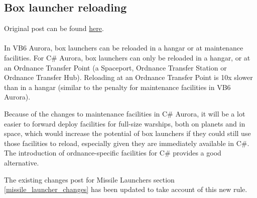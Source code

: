 \documentclass[../../Aurora C# unofficial manual.tex]{subfiles}
\begin{document}
	\subsection{Box launcher reloading}
	Original post can be found
	\href{http://aurora2.pentarch.org/index.php?topic=8495.msg109127#msg109127}{here}.
	\\\\
	
	In VB6 Aurora, box launchers can be reloaded in a hangar or at maintenance facilities. For C\# Aurora, box launchers can only be reloaded in a hangar, or at an Ordnance Transfer Point (a Spaceport, Ordnance Transfer Station or Ordnance Transfer Hub). Reloading at an Ordnance Transfer Point is 10x slower than in a hangar (similar to the penalty for maintenance facilities in VB6 Aurora).
	
	Because of the changes to maintenance facilities in C\# Aurora, it will be a lot easier to forward deploy facilities for full-size warships, both on planets and in space, which would increase the potential of box launchers if they could still use those facilities to reload, especially given they are immediately available in C\#. The introduction of ordnance-specific facilities for C\# provides a good alternative.
	
	The existing changes post for Missile Launchers section \ref{missile_launcher_changes} has been updated to take account of this new rule.
\end{document}
